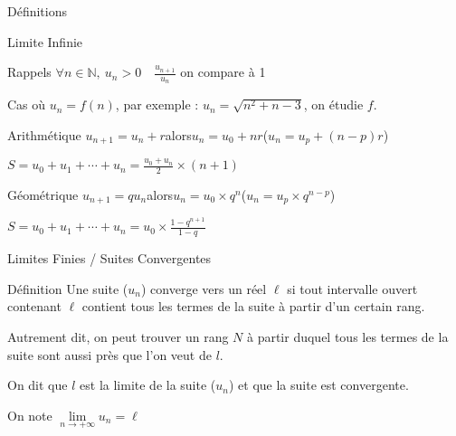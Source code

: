 \documentclass{cours}
\begin{document}
\begin{Gpartie}{Définitions}
\begin{Spartie}{Limite Infinie}
\begin{SSpartie}{Rappels}
                $\forall n\in\mathbb{N},\ u_n>0\quad\frac{u_{n+1}}{u_n}$ on compare à 1

                Cas où $u_n=f(n)$, par exemple : $u_n=\sqrt{n^2+n-3}$, on étudie $f$.
                \begin{SSSpartie}{Arithmétique} 
                    $u_{n+1}=u_n+r$\quad alors\quad $u_n=u_0+nr$\quad\big($u_n=u_p+(n-p)r$\big)

                    $S=u_0+u_1+\dotsb+u_n=\frac{u_0+u_n}{2}\times(n+1)$
                \end{SSSpartie}
                \begin{SSSpartie}{Géométrique} 
                    $u_{n+1}=qu_n$\quad alors\quad $u_n=u_0\times q^n$\quad\big($u_n=u_p\times q^{n-p}$\big)

                    $S=u_0+u_1+\dotsb+u_n=u_0\times\frac{1-q^{n+1}}{1-q}$
                \end{SSSpartie}
            \end{SSpartie}
        \end{Spartie}
        \pagebreak
        \begin{Spartie}{Limites Finies / Suites Convergentes} 
            \begin{SSpartie}{Définition} 
                Une suite ($u_n$) converge vers un réel $\ell$ si tout intervalle ouvert contenant $\ell$ contient tous les termes de la suite à partir d'un certain rang.

                Autrement dit, on peut trouver un rang $N$ à partir duquel tous les termes de la suite sont aussi près que l'on veut de $l$.

                On dit que $l$ est la limite de la suite ($u_n$) et que la suite est convergente.

                On note $\lim\limits_{n\to +\infty} u_n=\ell$


\end{SSpartie}
\end{Spartie}
\end{Gpartie}
\end{document}
